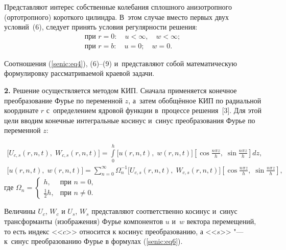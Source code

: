 Представляют интерес собственные колебания сплошного анизотропного 
(ортотропного) короткого цилиндра. В~этом случае вместо первых двух условий~(6), следует принять условия регулярности решения:
\begin{equation}
 \begin{array}{l}
\displaystyle
\text{при } r = 0:\quad  u < \infty,\quad w < \infty ;
\\\displaystyle
\text{при } r = b:\quad  u = 0;\quad w = 0.
\end{array}
\end{equation}


Соотношения (\ref{senic:eq4}), (6)--(9) и~представляют собой математическую формулировку 
рассматриваемой краевой задачи.

\textbf{2.} Решение осуществляется методом КИП. Сначала применяется конечное преобразование Фурье по 
переменной $z$, а~затем обобщённое КИП по радиальной координате $r$ с~определением 
ядровой функции в~процессе решения~[3]. Для этой цели вводим конечные интегральные косинус и~синус 
преобразования Фурье по переменной $z$:

\begin{gather}
 \label{senic:eq6}
\Big[ {U_{c,s} \left( {r,n,t} \right),\; W_{c,s} \left( {r,n,t} \right)} 
\Big] = \int\limits_0 ^h {\Big[ {u\left( {r,n,t} \right),\; w\left( 
{r,n,t} \right)} \Big]} \left[ {\cos \frac{n\pi z}{h},\; \sin \frac{n\pi 
z}{h}} \right]dz,
\\
\Big[ {u\left( {r,n,t} \right),\; w\left( {r,n,t} \right)} \Big] = 
\sum\limits_{n = 0}^\infty {\Omega _n^{ - 1} } \Big[ {U_{c,s} \left( 
{r,n,t} \right),\; W_{c,s} \left( {r,n,t} \right)} \Big]\left[ {\cos 
\frac{n\pi z}{h},\; \sin \frac{n\pi z}{h}} \right],
\end{gather}
где $\Omega _n = \left\{ {\begin{array}{cl}
 h, & \text{при }  n=0,\\
 \frac12 h, & \text{при }  n\ne0.
 \end{array}} \right.$ 

Величины $U_c$, $W_c $ и $U_s$, $W_s $ представляют соответственно косинус и~синус трансформанты (изображения) Фурье компонентов $u$ и~$w$ вектора перемещений, то есть 
индекс <<$c$>> относится к косинус преобразованию, а <<$s$>> "--- к~синус 
преобразованию Фурье в формулах (\ref{senic:eq6}).

